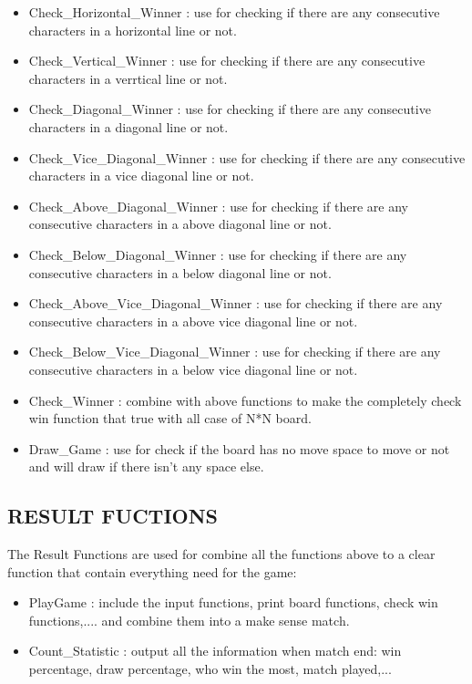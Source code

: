 \documentclass[12pt,a4paper]{article}
\begin{document}
\begin{itemize}
     \item Check\_Horizontal\_Winner : use for checking if there are any consecutive characters in a horizontal line or not.
     \item Check\_Vertical\_Winner : use for checking if there are any consecutive characters in a verrtical line or not.
     \item Check\_Diagonal\_Winner : use for checking if there are any consecutive characters in a diagonal line or not.
     \item Check\_Vice\_Diagonal\_Winner : use for checking if there are any consecutive characters in a vice diagonal line or not.
     \item Check\_Above\_Diagonal\_Winner : use for checking if there are any consecutive characters in a above diagonal line or not.
     \item Check\_Below\_Diagonal\_Winner : use for checking if there are any consecutive characters in a below diagonal line or not.
     \item Check\_Above\_Vice\_Diagonal\_Winner : use for checking if there are any consecutive characters in a above vice diagonal line or not.
     \item Check\_Below\_Vice\_Diagonal\_Winner : use for checking if there are any consecutive characters in a below vice diagonal line or not.
     \item Check\_Winner : combine with above functions to make the completely check win function that true with all case of N*N board.
     \item Draw\_Game : use for check if the board has no move space to move or not and will draw if there isn't any space else.
\end{itemize}
\Large \subsection{\color{blue}\textbf{RESULT FUCTIONS} }
The Result Functions are used for combine all the functions above to a clear function that contain everything need for the game:
\begin{itemize}
    \item PlayGame : include the input functions, print board functions, check win functions,.... and combine them into a make sense match.
    \item Count\_Statistic : output all the information when match end: win percentage, draw percentage, who win the most, match played,...
\end{itemize}
\end{document}
